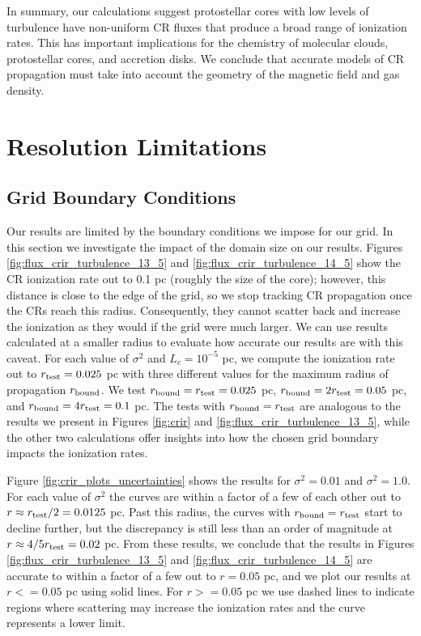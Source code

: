 \documentclass[twocolumn]{aastex63}
\begin{document}
In summary, our calculations suggest protostellar cores with low levels of turbulence have non-uniform CR fluxes that produce a broad range of ionization rates. This has important implications for the chemistry of molecular clouds, protostellar cores, and accretion disks. We conclude that accurate models of CR propagation must take into account the geometry of the magnetic field and gas density.

\appendix

\section{Resolution Limitations}
\label{appendix:uncertainties}

\subsection{Grid Boundary Conditions}
\label{appendix_subsection:boundary_conditions}

Our results are limited by the boundary conditions we impose for our grid. In this section we investigate the impact of the domain size on our results. Figures \ref{fig:flux_crir_turbulence_13_5} and \ref{fig:flux_crir_turbulence_14_5} show the CR ionization rate out to 0.1 pc (roughly the size of the core); however, this distance is close to the edge of the grid, so we stop tracking CR propagation once the CRs reach this radius. Consequently, they cannot scatter back and increase the ionization as they would if the grid were much larger. We can use results calculated at a smaller radius to evaluate how accurate our results are with this caveat. For each value of $\sigma^2$ and $L_c = 10^{-5}$ pc, we compute the ionization rate out to $r_{\rm test}=0.025$ pc with three different values for the maximum radius of propagation $r_{\rm bound}$. We test $r_{\rm bound}=r_{\rm test}=0.025$ pc, $r_{\rm bound}=2r_{\rm test}=0.05$ pc, and $r_{\rm bound}=4r_{\rm test}=0.1$ pc. The tests with $r_{\rm bound}=r_{\rm test}$ are analogous to the results we present in Figures \ref{fig:crir} and \ref{fig:flux_crir_turbulence_13_5}, while the other two calculations offer insights into how the chosen grid boundary impacts the ionization rates.

Figure \ref{fig:crir_plots_uncertainties} shows the results for $\sigma^2=0.01$ and $\sigma^2=1.0$. For each value of $\sigma^2$ the curves are within a factor of a few of each other out to $r \approx r_{\rm test}/2= 0.0125$ pc. Past this radius, the curves with $r_{\rm bound}=r_{\rm test}$ start to decline further, but the discrepancy is still less than an order of magnitude at $r \approx 4/5 r_{\rm test}=0.02$ pc. From these results, we conclude that the results in Figures \ref{fig:flux_crir_turbulence_13_5} and \ref{fig:flux_crir_turbulence_14_5} are accurate to within a factor of a few out to $r=0.05$ pc, and we plot our results at $r<=0.05$ pc using solid lines. For $r>=0.05$ pc we use dashed lines to indicate regions where scattering may increase the ionization rates and the curve represents a lower limit. 
\end{document}
